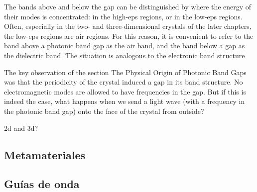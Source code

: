 The bands above and below the gap can be distinguished by where the energy
of their modes is concentrated: in the high-eps regions, or in the low-eps regions. Often,
especially in the two- and three-dimensional crystals of the later chapters, the
low-eps regions are air regions. For this reason, it is convenient to refer to the
band above a photonic band gap as the air band, and the band below a gap as
the dielectric band. The situation is analogous to the electronic band structure

The key observation of the section The Physical Origin of Photonic Band Gaps
was that the periodicity of the crystal induced a gap in its band structure. No
electromagnetic modes are allowed to have frequencies in the gap. But if this is
indeed the case, what happens when we send a light wave (with a frequency in
the photonic band gap) onto the face of the crystal from outside?

2d and 3d?

\subsection{Metamateriales}
\label{subsec.2-metamateriales}


\subsection{Guías de onda}
\label{subsec.2-guias}